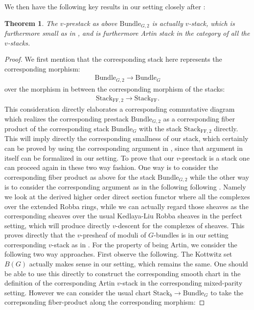 \documentclass[12pt]{book}
\newtheorem{theorem}{Theorem}
\theoremstyle{definition}
\begin{document}
\indent We then have the following key results in our setting closely after \cite[Chapter III, Chapter IV, Chapter V]{FS}:

\begin{theorem}
The $v$-prestack as above $\mathrm{Bundle}_{G,2}$ is actually $v$-stack, which is furthermore small as in \cite{FS}, and is furthermore Artin stack in the category of all the $v$-stacks.
\end{theorem}

\begin{proof}
We first mention that the corresponding stack here represents the corresponding morphism:
\begin{align}
\mathrm{Bundle}_{G,2} \rightarrow \mathrm{Bundle}_{G}
\end{align}
over the morphism in between the corresponding morphism of the stacks:
\begin{align}
\mathrm{Stack}_{\mathrm{FF},2}\rightarrow \mathrm{Stack}_{\mathrm{FF}}.
\end{align}
This consideration directly elaborates a corresponding commutative diagram which realizes the corresponding prestack $\mathrm{Bundle}_{G,2}$ as a corresponding fiber product of the corresponding stack $\mathrm{Bundle}_{G}$ with the stack $\mathrm{Stack}_{\mathrm{FF},2}$ directly. This will imply directly the corresponding smallness of our stack, which certainly can be proved by using the corresponding argument in \cite[Proposition 1.3 in Chapter III]{FS}, since that argument in itself can be formalized in our setting. To prove that our $v$-prestack is a stack one can proceed again in these two way fashion. One way is to consider the corresponding fiber product as above for the stack $\mathrm{Bundle}_{G,2}$ while the other way is to consider the corresponding argument as in the following following \cite{FS}. Namely we look at the derived higher order direct section functor where all the complexes over the extended Robba rings, while we can actually regard those sheaves as the corresponding sheaves over the usual Kedlaya-Liu Robba sheaves in the perfect setting, which will produce directly $v$-descent for the complexes of sheaves. This proves directly that the $v$-presheaf of moduli of $G$-bundles is in our setting corresponding $v$-stack as in \cite{FS}. For the property of being Artin, we consider the following two way approaches. First observe the following. The Kottwitz set $B(G)$ actually makes sense in our setting, which remains the same. One should be able to use this directly to construct the corresponding smooth chart in the definition of the corresponding Artin $v$-stack in the corresponding mixed-parity setting. However we can consider the usual chart $\mathrm{Stack}_b\rightarrow \mathrm{Bundle}_{G}$ to take the correpsonding fiber-product along the corresponding morphism:

\end{proof}
\end{document}
